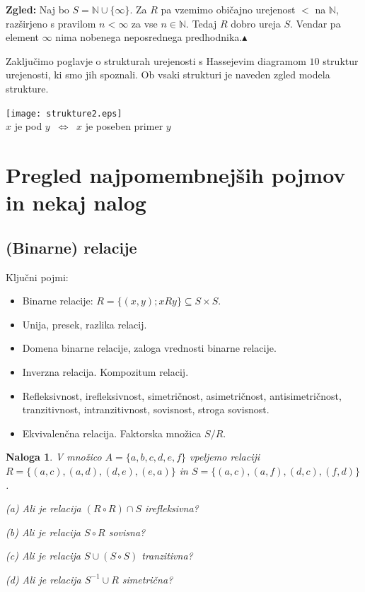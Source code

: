 \documentclass[11pt,paper=b5,footinclude,headinclude]{scrbook} %
\def\cee {{~\Leftrightarrow~}}
\def\zgled{\noindent\textbf{\color{blue} Zgled: }}
\def\kz{{\hfill{\color{blue}$\blacktriangle$}}}%
\newtheorem*{problem}{Naloga}
\begin{document}
\bigskip
\zgled
Naj bo $S = \mathbb{N}\cup\{\infty\}$. Za $R$ pa vzemimo običajno urejenost $<$ na $\mathbb{N}$, razširjeno s pravilom $n<\infty$ za vse $n\in \mathbb{N}$. Tedaj $R$ dobro ureja $S$. Vendar pa element $\infty$ nima nobenega neposrednega predhodnika.\kz


Zaključimo poglavje o strukturah urejenosti s Hassejevim diagramom $10$ struktur urejenosti, ki smo jih spoznali.
Ob vsaki strukturi je naveden zgled modela strukture.

\begin{center}
\texttt{[image: strukture2.eps]}
~~\\
$x$ je pod $y$ $\cee$ $x$ je poseben primer $y$
\end{center}

\section{Pregled najpomembnejših pojmov in nekaj nalog}


\subsection{(Binarne) relacije}

Ključni pojmi:
\begin{itemize}
  \item Binarne relacije:
  $R = \{(x,y) ; xRy \}\subseteq S\times S$.
  \item Unija, presek, razlika relacij.
  \item Domena binarne relacije, zaloga vrednosti binarne relacije.
  \item Inverzna relacija. Kompozitum relacij.
\item Refleksivnost, irefleksivnost, simetričnost, asimetričnost, antisimetričnost, tranzitivnost, intranzitivnost,
sovisnost, stroga sovisnost.
\item Ekvivalenčna relacija. Faktorska množica $S/R$.
\end{itemize}

\begin{problem}
V množico $A = \{a, b, c, d, e, f \}$ vpeljemo relaciji
$R = \{(a, c), (a, d), (d, e), (e, a)\}$ in
$S = \{(a, c), (a, f), (d, c), (f, d)\}$ .

(a) Ali je relacija $(R\circ R)\cap S$ irefleksivna?

(b) Ali je relacija $S\circ R$ sovisna?

(c) Ali je relacija $S\cup (S\circ S)$ tranzitivna?

(d) Ali je relacija $S^{-1}\cup R$ simetrična?
\end{problem}
\end{document}
